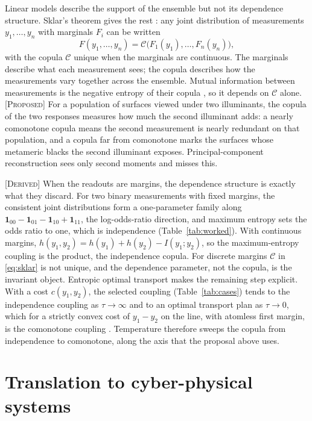 \documentclass[11pt]{article}
\theoremstyle{boldplain}
\theoremstyle{boldupright}
\newcommand{\derived}{[\textup{\textsc{Derived}}]}
\newcommand{\proposed}{[\textup{\textsc{Proposed}}]}
\newcommand{\cop}{\mathcal{C}}
\newcommand{\one}{\mathbf{1}}
\begin{document}
Linear models describe the support of the ensemble but not its dependence structure. Sklar's
theorem gives the rest \cite{sklar1959}: any joint distribution of measurements $y_1,\dots,y_n$ with marginals $F_i$ can
be written
\begin{equation}\label{eq:sklar}
F(y_1,\dots,y_n)=\cop\bigl(F_1(y_1),\dots,F_n(y_n)\bigr),
\end{equation}
with the copula $\cop$ unique when the marginals are continuous. The marginals describe what each
measurement sees; the copula describes how the measurements vary together across the ensemble.
Mutual information between measurements is the negative entropy of their copula \cite{ma2011}, so it depends
on $\cop$ alone. \proposed{} For a population of surfaces viewed under two illuminants, the copula of the
two responses measures how much the second illuminant adds: a nearly comonotone copula means
the second measurement is nearly redundant on that population, and a copula far from comonotone
marks the surfaces whose metameric blacks the second illuminant exposes. Principal-component
reconstruction sees only second moments and misses this.

\derived{} When the readouts are margins, the dependence structure is exactly what they discard. For
two binary measurements with fixed margins, the consistent joint distributions form a one-parameter
family along $\one_{00}-\one_{01}-\one_{10}+\one_{11}$, the log-odds-ratio direction, and maximum entropy sets the odds ratio to one,
which is independence (Table~\ref{tab:worked}). With continuous margins, $h(y_1,y_2)=h(y_1)+h(y_2)-I(y_1;y_2)$, so the
maximum-entropy coupling is the product, the independence copula. For discrete margins $\cop$ in
\eqref{eq:sklar} is not unique, and the dependence parameter, not the copula, is the invariant object. Entropic
optimal transport makes the remaining step explicit. With a cost $c(y_1,y_2)$, the selected coupling
(Table~\ref{tab:cases}) tends to the independence coupling as $\tau\to\infty$ and to an optimal transport plan as $\tau\to0$, which
for a strictly convex cost of $y_1-y_2$ on the line, with atomless first margin, is the comonotone coupling
\cite{santambrogio2015}. Temperature therefore sweeps the copula from independence to comonotone, along the axis that
the proposal above uses.

\section{Translation to cyber-physical systems}\label{sec:cps}
\end{document}
